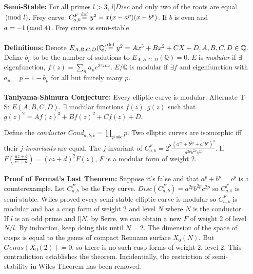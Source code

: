 {\bf Semi-Stable:} For all primes $l>3$, $l|Disc$ and only two of the roots are equal 
$\thinspace \textnormal{(mod } l \textnormal{)}$.
Frey curve: $C^F_{a,b} 
{\buildrel\rm def\over =} \; 
y^2= x (x-a^p) (x-b^p)$.  
If $b$ is even and $a = -1 \thinspace \textnormal{(mod } 4 \textnormal{)}$.  Frey curve is semi-stable.
\\
\\ 
{\bf Definitions:}
Denote $E_{A,B,C,D}({\mathbb Q}) {\buildrel\rm def\over =} \; 
y^2= Ax^3 + B x^2 + CX +D, A, B, C, D \in {\mathbb Q}$.
Define $b_p$ to be the number of solutions to $E_{A,B,C,D}({\mathbb Q})= 0$. $E$ 
is \emph{modular} if
$\exists$ eigenfunction, $f(z)= \sum_n a_n e^{2 \pi i n z}$. $E/{\mathbb Q}$
is modular if $\exists f$ and eigenfunction with $a_p=p+1-b_p$ for all but finitely many
$p$.
\\
\\
{\bf Taniyama-Shimura Conjecture:}  Every elliptic curve is modular.
Alternate T-S: $E(A,B,C,D)$.  $\exists$ modular functions $f(z), g(z)$ such that
$g(z)^2= Af(z)^3+Bf(z)^2+C f(z) +D$.
\begin{quote}
\end{quote}
Define the \emph{conductor}
$Cond_{a,b,c}= \prod_{p|abc} p$.  Two elliptic curves are isomorphic
iff their \emph{$j$-invariants} are equal. The $j$-invariant of $C^F_{a,b} =
2^8 {\frac {(a^{2p} +b^{2p} +a^p b^p)^3} {a^{2p} b^{2p} c^{2p}}}$.
If $F({\frac {az+b} {cz+d}})= (cz+d)^2 F(z)$, $F$ is a modular form of weight $2$.
\\
\\
{\bf Proof of Fermat's Last Theorem:}  Suppose it's false and that $a^p + b^p= c^p$ is
a counterexample.  Let 
$C^F_{a,b}$ be the Frey curve.  $Disc(C^F_{a,b})= a^{2p} b^{2p}c^{2p}$ so
$C^F_{a,b}$ is semi-stable.
Wiles proved every semi-stable elliptic curve is modular so
$C^F_{a,b}$ is modular and has a cusp form of weight $2$ and level $N$ where $N$
is the conductor.
If $l$ is an odd prime and $l|N$,
by Serre, we can obtain a new $F$ of
weight 2 of level $N/l$.  By induction, keep doing this until $N=2$.  The dimension
of the space of cusps is equal to the genus of compact Reimann surface $X_0(N)$.  
But $Genus(X_0(2))= 0$, so there is no such cusp forms of weight $2$, level $2$.
This contradiction establishes the theorem.  Incidentially, the restriction of semi-stability
in Wiles Theorem has been removed.
